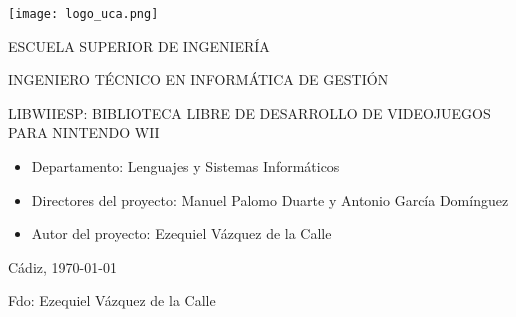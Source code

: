 



\begin{center}

  \texttt{[image: logo\_uca.png]} \\

  \vspace{2.0cm}

  \Large{ESCUELA SUPERIOR DE INGENIERÍA} \\

  \vspace{2.0cm}

  \large{INGENIERO TÉCNICO EN INFORMÁTICA DE GESTIÓN} \\

  \vspace{2.5cm}

  \large{LIBWIIESP: BIBLIOTECA LIBRE DE DESARROLLO DE VIDEOJUEGOS PARA NINTENDO WII} \\

  \vspace{1.0cm}

\end{center}

\begin{itemize}
\item \large{Departamento: Lenguajes y Sistemas Informáticos}
\item \large{Directores del proyecto: Manuel Palomo Duarte y Antonio García Domínguez}
\item \large{Autor del proyecto: Ezequiel Vázquez de la Calle}
\end{itemize}

\vspace{1.0cm}

\begin{flushright}
  \large{Cádiz, \today} \\

  \vspace{3.5cm}

  \large{Fdo: Ezequiel Vázquez de la Calle}
\end{flushright}
